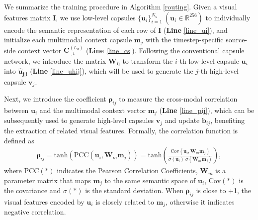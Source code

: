 \documentclass[sigconf]{acmart}
\begin{document}
We summarize the training procedure in Algorithm \ref{routing}. 
Given a visual features matrix $\mathbf{I}$, 
we use low-level capsules $\{\mathbf{u}_i\}_{i=1}^{N_u}~(\mathbf{u}_i\in\mathbb{R}^{256})$ to individually encode the semantic representation of each row of  $\mathbf{I}$ (\textbf{Line} \ref{line_ui}), 
and initialize each multimodal context capsule $\mathbf{m}_j$ with the timestep-specific source-side context vector $\mathbf{C}_{.,t}^{(L_d)}$ (\textbf{Line} \ref{line_cs}). 
Following the conventional capsule network,
we introduce the matrix $\mathbf{W_{ij}}$ to transform the $i$-th low-level capsule $\mathbf{u}_i$ into $\mathbf{\hat{u}_{j|i}}$ (\textbf{Line} \ref{line_uhij}), 
which will be used to generate the $j$-th high-level capsule $\mathbf{v}_j$.

Next, we introduce the coefficient $\mathbf{\rho}_{ij}$ to measure the cross-modal correlation between $\mathbf{u}_i$ and the multimodal context vector $\mathbf{m}_j$ (\textbf{Line} \ref{line_pij}), which can be subsequently used to generate high-level capsules $\mathbf{v}_j$ and update $\mathbf{b}_{ij}$, benefiting the extraction of related visual features. 
Formally, 
the correlation function is defined as
\begin{align}
\mathbf{\rho}_{ij}=\mathrm{tanh}(\mathrm{PCC}(\mathbf{u}_i,\mathbf{W}_m\mathbf{m}_j))=\mathrm{tanh}(\frac{\text{Cov}(\mathbf{u}_i,\mathbf{W}_m\mathbf{m}_j)}{\sigma(\mathbf{u}_i) ~\sigma(\mathbf{W}_m\mathbf{m}_j)}), \label{pcc}
\end{align}
where $\text{PCC}(*)$ indicates the Pearson Correlation Coefficients, $\mathbf{W}_m$ is a parameter matrix that maps $\mathbf{m}_j$ to the same semantic space of $\mathbf{u}_i$, $\text{Cov}(*)$ is the covariance and $\sigma(*)$ is the standard deviation. 
When $\mathbf{\rho}_{ij}$ is close to +1, 
the visual features encoded by $\mathbf{u}_i$ is closely related to $\mathbf{m}_j$, 
otherwise it indicates negative correlation. 
\end{document}
